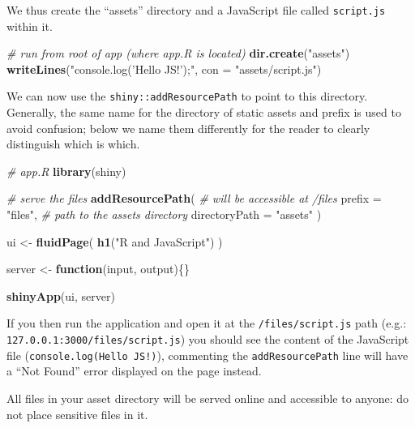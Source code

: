 \documentclass[10pt,]{krantz}
\makeatletter
\newenvironment{Shaded}{\begin{snugshade}}{\end{snugshade}}
\newcommand{\CommentTok}[1]{\textcolor[rgb]{0.37,0.37,0.37}{\textit{#1}}}
\newcommand{\ControlFlowTok}[1]{\textcolor[rgb]{0.27,0.27,0.27}{\textbf{#1}}}
\newcommand{\DataTypeTok}[1]{\textcolor[rgb]{0.27,0.27,0.27}{#1}}
\newcommand{\KeywordTok}[1]{\textcolor[rgb]{0.27,0.27,0.27}{\textbf{#1}}}
\newcommand{\NormalTok}[1]{#1}
\newcommand{\StringTok}[1]{\textcolor[rgb]{0.5,0.5,0.5}{#1}}
\newenvironment{kframe}{%
\medskip{}
\setlength{\fboxsep}{.8em}
 \def\at@end@of@kframe{}%
 \ifinner\ifhmode%
  \def\at@end@of@kframe{\end{minipage}}%
  \begin{minipage}{\columnwidth}%
 \fi\fi%
 \def\FrameCommand##1{\hskip\@totalleftmargin \hskip-\fboxsep
 \colorbox{shadecolor}{##1}\hskip-\fboxsep
     \hskip-\linewidth \hskip-\@totalleftmargin \hskip\columnwidth}%
 \MakeFramed {\advance\hsize-\width
   \@totalleftmargin\z@ \linewidth\hsize
   \@setminipage}}%
 {\par\unskip\endMakeFramed%
 \at@end@of@kframe}
\renewenvironment{Shaded}{\begin{kframe}}{\end{kframe}}
\newenvironment{rmdblock}[1]
  {
  \begin{itemize}
  \renewcommand{\labelitemi}{
    \raisebox{-.7\height}[0pt][0pt]{
      {\setkeys{Gin}{width=3em,keepaspectratio}\texttt{[image: images/\#1]}}
    }
  }
  \setlength{\fboxsep}{1em}
  \begin{kframe}
  \item
  }
  {
  \end{kframe}
  \end{itemize}
  }
\newenvironment{rmdnote}
  {\begin{rmdblock}{note}}
  {\end{rmdblock}}
\makeatother
\begin{document}
We thus create the ``assets'' directory and a JavaScript file called \texttt{script.js} within it.

\begin{Shaded}
\begin{Highlighting}[]
\CommentTok{# run from root of app (where app.R is located)}
\KeywordTok{dir.create}\NormalTok{(}\StringTok{"assets"}\NormalTok{)}
\KeywordTok{writeLines}\NormalTok{(}\StringTok{"console.log('Hello JS!');"}\NormalTok{, }\DataTypeTok{con =} \StringTok{"assets/script.js"}\NormalTok{)}
\end{Highlighting}
\end{Shaded}

We can now use the \texttt{shiny::addResourcePath} to point to this directory. Generally, the same name for the directory of static assets and prefix is used to avoid confusion; below we name them differently for the reader to clearly distinguish which is which.

\begin{Shaded}
\begin{Highlighting}[]
\CommentTok{# app.R}
\KeywordTok{library}\NormalTok{(shiny)}

\CommentTok{# serve the files}
\KeywordTok{addResourcePath}\NormalTok{(}
  \CommentTok{# will be accessible at /files}
  \DataTypeTok{prefix =} \StringTok{"files"}\NormalTok{, }
  \CommentTok{# path to the assets directory}
  \DataTypeTok{directoryPath =} \StringTok{"assets"}
\NormalTok{)}

\NormalTok{ui <-}\StringTok{ }\KeywordTok{fluidPage}\NormalTok{(}
  \KeywordTok{h1}\NormalTok{(}\StringTok{"R and JavaScript"}\NormalTok{)}
\NormalTok{)}

\NormalTok{server <-}\StringTok{ }\ControlFlowTok{function}\NormalTok{(input, output)\{\}}

\KeywordTok{shinyApp}\NormalTok{(ui, server)}
\end{Highlighting}
\end{Shaded}

If you then run the application and open it at the \texttt{/files/script.js} path (e.g.: \texttt{127.0.0.1:3000/files/script.js}) you should see the content of the JavaScript file (\texttt{console.log(\textquotesingle{}Hello\ JS!\textquotesingle{})}), commenting the \texttt{addResourcePath} line will have a ``Not Found'' error displayed on the page instead.

\begin{rmdnote}
All files in your asset directory will be served online and
accessible to anyone: do not place sensitive files in it.
\end{rmdnote}
\end{document}
